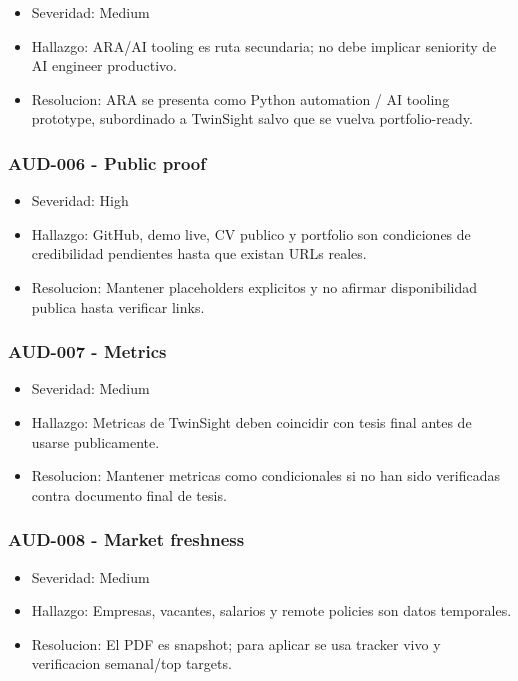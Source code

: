 \begin{itemize}
\item Severidad: Medium
\item Hallazgo: ARA/AI tooling es ruta secundaria; no debe implicar seniority de AI engineer productivo.
\item Resolucion: ARA se presenta como Python automation / AI tooling prototype, subordinado a TwinSight salvo que se vuelva portfolio-ready.
\end{itemize}


\subsubsection{AUD-006 - Public proof}


\begin{itemize}
\item Severidad: High
\item Hallazgo: GitHub, demo live, CV publico y portfolio son condiciones de credibilidad pendientes hasta que existan URLs reales.
\item Resolucion: Mantener placeholders explicitos y no afirmar disponibilidad publica hasta verificar links.
\end{itemize}


\subsubsection{AUD-007 - Metrics}


\begin{itemize}
\item Severidad: Medium
\item Hallazgo: Metricas de TwinSight deben coincidir con tesis final antes de usarse publicamente.
\item Resolucion: Mantener metricas como condicionales si no han sido verificadas contra documento final de tesis.
\end{itemize}


\subsubsection{AUD-008 - Market freshness}


\begin{itemize}
\item Severidad: Medium
\item Hallazgo: Empresas, vacantes, salarios y remote policies son datos temporales.
\item Resolucion: El PDF es snapshot; para aplicar se usa tracker vivo y verificacion semanal/top targets.
\end{itemize}


